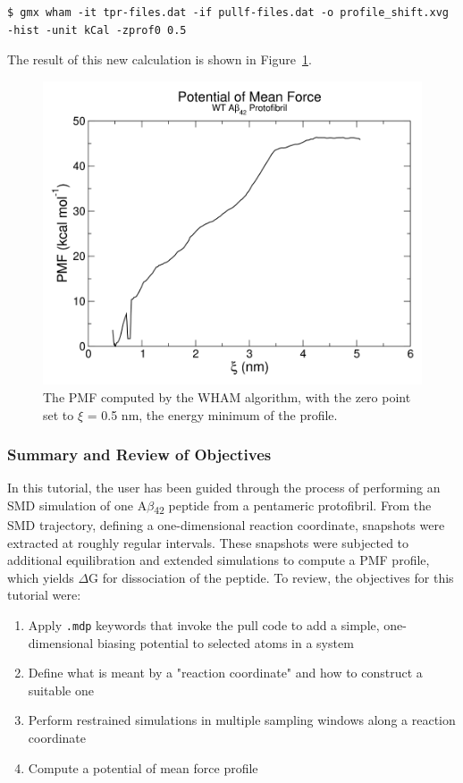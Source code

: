 \documentclass[9pt,tutorial,pubversion]{livecoms}
\begin{document}
\begin{lstlisting}
$ gmx wham -it tpr-files.dat -if pullf-files.dat -o profile_shift.xvg -hist -unit kCal -zprof0 0.5
\end{lstlisting}

The result of this new calculation is shown in Figure~\ref{umbrella_pmf_shift_fig}.

\begin{figure}[h!]
\centering
\includegraphics{umbrella_pmf_shift}
\caption{The PMF computed by the WHAM algorithm, with the zero point set to $\xi$ = 0.5 nm, the energy minimum of the profile.}
\label{umbrella_pmf_shift_fig}
\end{figure}

\subsubsection{Summary and Review of Objectives} \label{umbrella_summary}

In this tutorial, the user has been guided through the process of performing an SMD simulation of one A$\beta$\textsubscript{42} peptide from a pentameric protofibril. From the SMD trajectory, defining a one-dimensional reaction coordinate, snapshots were extracted at roughly regular intervals. These snapshots were subjected to additional equilibration and extended simulations to compute a PMF profile, which yields $\Delta$G for dissociation of the peptide. To review, the objectives for this tutorial were:

\begin{enumerate}
	\item Apply \texttt{.mdp} keywords that invoke the pull code to add a simple, one-dimensional biasing potential to selected atoms in a system
	\item Define what is meant by a "reaction coordinate" and how to construct a suitable one
	\item Perform restrained simulations in multiple sampling windows along a reaction coordinate
	\item Compute a potential of mean force profile
\end{enumerate}
\end{document}
